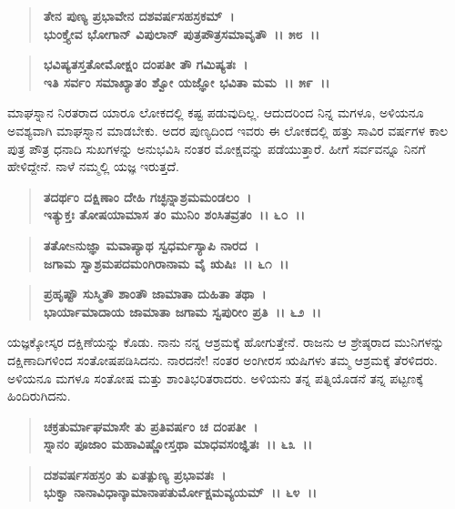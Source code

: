 \begin{verse}
\textbf{ತೇನ ಪುಣ್ಯ ಪ್ರಭಾವೇನ ದಶವರ್ಷಸಹಸ್ರಕಮ್~।}\\\textbf{ಭುಂಕ್ತ್ಯೇವ ಭೋಗಾನ್ ವಿಪುಲಾನ್ ಪುತ್ರಪೌತ್ರಸಮಾವೃತೌ~।। ೫೮~।। }
\end{verse}

\begin{verse}
\textbf{ಭವಿಷ್ಯತಸ್ತತೋಮೋಕ್ಷಂ ದಂಪತೀ ತೌ ಗಮಿಷ್ಯತಃ~।}\\\textbf{ಇತಿ ಸರ್ವಂ ಸಮಾಖ್ಯಾತಂ ಶ್ವೋ ಯಜ್ಞೋ ಭವಿತಾ ಮಮ~।। ೫೯~।।}
\end{verse}

ಮಾಘಸ್ನಾನ ನಿರತರಾದ ಯಾರೂ ಲೋಕದಲ್ಲಿ ಕಷ್ಟ ಪಡುವುದಿಲ್ಲ. ಆದುದರಿಂದ ನಿನ್ನ ಮಗಳೂ, ಅಳಿಯನೂ ಅವಶ್ಯವಾಗಿ ಮಾಘಸ್ನಾನ ಮಾಡಬೇಕು. ಅದರ ಪುಣ್ಯದಿಂದ ಇವರು ಈ ಲೋಕದಲ್ಲಿ ಹತ್ತು ಸಾವಿರ ವರ್ಷಗಳ ಕಾಲ ಪುತ್ರ ಪೌತ್ರ ಧನಾದಿ ಸುಖಗಳನ್ನು ಅನುಭವಿಸಿ ನಂತರ ಮೋಕ್ಷವನ್ನು ಪಡೆಯುತ್ತಾರೆ. ಹೀಗೆ ಸರ್ವವನ್ನೂ ನಿನಗೆ ಹೇಳಿದ್ದೇನೆ. ನಾಳೆ ನಮ್ಮಲ್ಲಿ ಯಜ್ಞ ಇರುತ್ತದೆ.

\begin{verse}
\textbf{ತದರ್ಥಂ ದಕ್ಷಿಣಾಂ ದೇಹಿ ಗಚ್ಛನ್ನಾಶ್ರಮಮಂಡಲಂ~।}\\\textbf{ಇತ್ಯುಕ್ತಃ ತೋಷಯಾಮಾಸ ತಂ ಮುನಿಂ ಶಂಸಿತವ್ರತಂ~।। ೬೦~।। }
\end{verse}

\begin{verse}
\textbf{ತತೋsನುಜ್ಞಾ ಮವಾಪ್ಯಾಥ ಸ್ವಧರ್ಮಸ್ಯಾಪಿ ನಾರದ~।}\\\textbf{ಜಗಾಮ ಸ್ವಾಶ್ರಮಪದಮಂಗಿರಾನಾಮ ವೈ ಋಷಿಃ~।। ೬೧~।। }
\end{verse}

\begin{verse}
\textbf{ಪ್ರಹೃಷ್ಟೌ ಸುಸ್ಮಿತೌ ಶಾಂತೌ ಜಾಮಾತಾ ದುಹಿತಾ ತಥಾ~।}\\\textbf{ಭಾರ್ಯಾಮಾದಾಯ ಜಾಮಾತಾ ಜಗಾಮ ಸ್ವಪುರೀಂ ಪ್ರತಿ~।। ೬೨~।।}
\end{verse}

ಯಜ್ಞಕ್ಕೋಸ್ಕರ ದಕ್ಷಿಣೆಯನ್ನು ಕೊಡು. ನಾನು ನನ್ನ ಆಶ್ರಮಕ್ಕೆ ಹೋಗುತ್ತೇನೆ. ರಾಜನು ಆ ಶ್ರೇಷ್ಠರಾದ ಮುನಿಗಳನ್ನು ದಕ್ಷಿಣಾದಿಗಳಿಂದ ಸಂತೋಷಪಡಿಸಿದನು. ನಾರದನೇ! ನಂತರ ಅಂಗೀರಸ ಋಷಿಗಳು ತಮ್ಮ ಆಶ್ರಮಕ್ಕೆ ತೆರಳಿದರು. ಅಳಿಯನೂ ಮಗಳೂ ಸಂತೋಷ ಮತ್ತು ಶಾಂತಿಭರಿತರಾದರು. ಅಳಿಯನು ತನ್ನ ಪತ್ನಿಯೊಡನೆ ತನ್ನ ಪಟ್ಟಣಕ್ಕೆ ಹಿಂದಿರುಗಿದನು.

\begin{verse}
\textbf{ಚಕ್ರತುರ್ಮಾಘಮಾಸೇ ತು ಪ್ರತಿವರ್ಷಂ ಚ ದಂಪತೀ~।}\\\textbf{ಸ್ನಾನಂ ಪೂಜಾಂ ಮಹಾವಿಷ್ಣೋಸ್ತಥಾ ಮಾಧವಸಂಜ್ಞಿತಃ~।। ೬೩~।। }
\end{verse}

\begin{verse}
\textbf{ದಶವರ್ಷಸಹಸ್ರಂ ತು ಏತತ್ಪುಣ್ಯ ಪ್ರಭಾವತಃ~।}\\\textbf{ಭುಕ್ವಾ ನಾನಾವಿಧಾನ್ಕಾಮಾನಾಪತುರ್ಮೋಕ್ಷಮವ್ಯಯಮ್~।। ೬೪~।।}
\end{verse}

